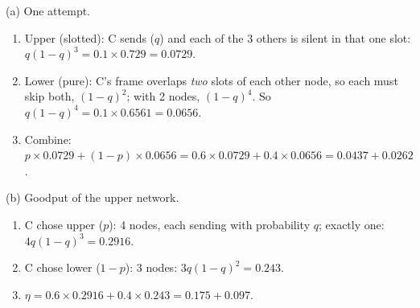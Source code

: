(a) One attempt.
\begin{enumerate}
  \item Upper (slotted): C sends ($q$) and each of the 3 others is silent in that one slot: $q(1-q)^3=0.1\times0.729=0.0729$.
  \item Lower (pure): C's frame overlaps \emph{two} slots of each other node, so each must skip both, $(1-q)^2$; with 2 nodes, $(1-q)^4$. So $q(1-q)^4=0.1\times0.6561=0.0656$.
  \item Combine: $p\times0.0729+(1-p)\times0.0656=0.6\times0.0729+0.4\times0.0656=0.0437+0.0262$.
\end{enumerate}
(b) Goodput of the upper network.
\begin{enumerate}
  \item C chose upper ($p$): 4 nodes, each sending with probability $q$; exactly one: $4q(1-q)^3=0.2916$.
  \item C chose lower ($1-p$): 3 nodes: $3q(1-q)^2=0.243$.
  \item $\eta=0.6\times0.2916+0.4\times0.243=0.175+0.097$.
\end{enumerate}

